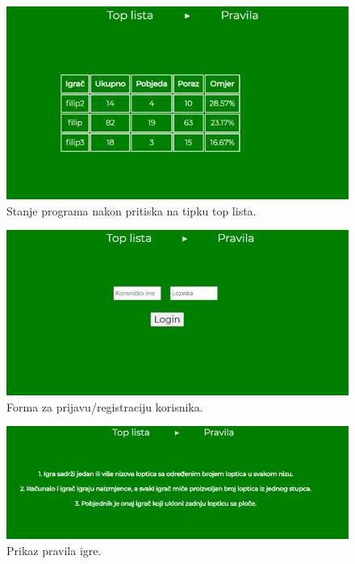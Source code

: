 \begin{figure}[H]
\centering
\includegraphics[width=14cm]{slike-program/Slika2.png}
\caption{Stanje programa nakon pritiska na tipku top lista.}
\label{}
\end{figure}

\begin{figure}[H]
\centering
\includegraphics[width=14cm]{slike-program/Slika3.png}
\caption{Forma za prijavu/registraciju korisnika.}
\label{}
\end{figure}

\begin{figure}[H]
\centering
\includegraphics[width=14cm]{slike-program/Slika4.png}
\caption{Prikaz pravila igre.}
\label{}
\end{figure}


